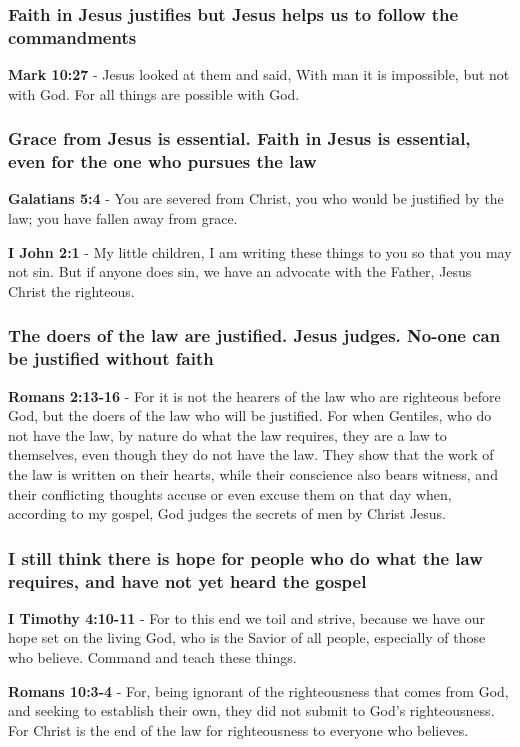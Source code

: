 \documentclass[11pt]{article}
\begin{document}
\subsubsection{Faith in Jesus justifies but Jesus helps us to follow the commandments}
\label{sec:org018a639}
\textbf{Mark 10:27} - Jesus looked at them and said, With man it is impossible, but not with God. For all things are possible with God.

\subsubsection{Grace from Jesus is essential. Faith in Jesus is essential, even for the one who pursues the law}
\label{sec:org5bc1caa}
\textbf{Galatians 5:4} - You are severed from Christ, you who would be justified by the law; you have fallen away from grace.

\textbf{I John 2:1} - My little children, I am writing these things to you so that you may not sin. But if anyone does sin, we have an advocate with the Father, Jesus Christ the righteous.

\subsubsection{The doers of the law are justified. Jesus judges. No-one can be justified without faith}
\label{sec:orgf12ec00}
\textbf{Romans 2:13-16} - For it is not the hearers of the law who are righteous before God, but the doers of the law who will be justified.  For when Gentiles, who do not have the law, by nature do what the law requires, they are a law to themselves, even though they do not have the law.  They show that the work of the law is written on their hearts, while their conscience also bears witness, and their conflicting thoughts accuse or even excuse them on that day when, according to my gospel, God judges the secrets of men by Christ Jesus.

\subsubsection{I still think there is hope for people who do what the law requires, and have not yet heard the gospel}
\label{sec:org08bce7f}
\textbf{I Timothy 4:10-11} - For to this end we toil and strive, because we have our hope set on the living God, who is the Savior of all people, especially of those who believe. Command and teach these things.

\textbf{Romans 10:3-4} - For, being ignorant of the righteousness that comes from God, and seeking to establish their own, they did not submit to God's righteousness. For Christ is the end of the law for righteousness to everyone who believes.
\end{document}
